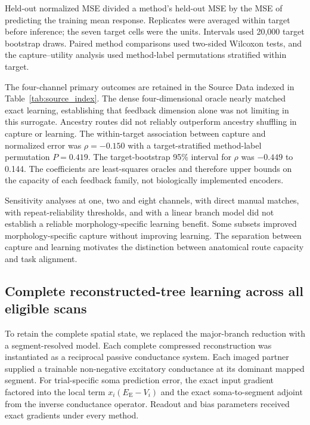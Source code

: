 Held-out normalized MSE divided a method's held-out MSE by the MSE of
predicting the training mean response. Replicates were averaged within target
before inference; the seven target cells were the units. Intervals used 20,000
target bootstrap draws. Paired method comparisons used two-sided Wilcoxon
tests, and the capture--utility analysis used method-label permutations
stratified within target.

The four-channel primary outcomes are retained in the Source Data indexed in Table~\ref{tab:source_index}.
The dense four-dimensional oracle nearly matched exact learning, establishing
that feedback dimension alone was not limiting in this surrogate. Ancestry routes
did not reliably outperform ancestry shuffling in capture or learning. The
within-target association between capture and normalized error was
$\rho=-0.150$ with a target-stratified method-label permutation $P=0.419$.
The target-bootstrap 95\% interval for $\rho$ was $-0.449$ to 0.144. The coefficients are
least-squares oracles and therefore upper bounds on the capacity of each
feedback family, not biologically implemented encoders.

Sensitivity analyses at one, two and eight channels, with direct manual
matches, with repeat-reliability thresholds, and with a linear branch model
did not establish a reliable morphology-specific learning benefit. Some
subsets improved morphology-specific capture without improving learning. The separation between capture and learning motivates the distinction
between anatomical route capacity and task alignment.

\subsection{Complete reconstructed-tree learning across all eligible scans}

To retain the complete spatial state, we replaced the major-branch reduction
with a segment-resolved model. Each complete compressed reconstruction was
instantiated as a reciprocal passive conductance system. Each imaged partner supplied a trainable
non-negative excitatory conductance at its dominant mapped segment. For
trial-specific soma prediction error, the exact input gradient factored into
the local term $x_i(E_{\mathrm E}-V_i)$ and the exact soma-to-segment adjoint from the
inverse conductance operator. Readout and bias parameters received exact
gradients under every method.

